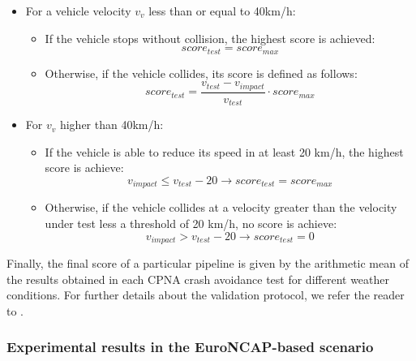 \begin{itemize}
	\item For a vehicle velocity \(v_v\) less than or equal to 40km/h:
	\begin{itemize}
		\item If the vehicle stops without collision, the highest score is achieved:
		\begin{equation}
			score_{test} = score_{max}
			\label{eq1}
		\end{equation}
		
		\item Otherwise, if the vehicle collides, its score is defined as follows:
		\begin{equation}
			score_{test} = \frac{v_{test}-v_{impact}}{v_{test}} \cdot score_{max}
			\label{eq2}
		\end{equation}
	\end{itemize}
	\item For \(v_v\) higher than 40km/h:
	\begin{itemize}
		\item If the vehicle is able to reduce its speed in at least 20 km/h, the highest score is achieve:
		\begin{equation}
			v_{impact} \leq v_{test} - 20 \to score_{test} = score_{max}
			\label{eq3}
		\end{equation}
		\item Otherwise, if the vehicle collides at a velocity greater than the velocity under test less a threshold of 20 km/h, no score is achieve:
		\begin{equation}
			v_{impact} > v_{test} - 20 \to score_{test} = 0
			\label{eq4}
		\end{equation}
	\end{itemize}
\end{itemize}

Finally, the final score of a particular pipeline is given by the arithmetic mean of the results obtained in each CPNA crash avoidance test for different weather conditions. For further details about the validation protocol, we refer the reader to \cite{gutierrez2021validation}.

\subsubsection{Experimental results in the EuroNCAP-based scenario}
\label{subsubsec:4_euroncap_experimental_results}

